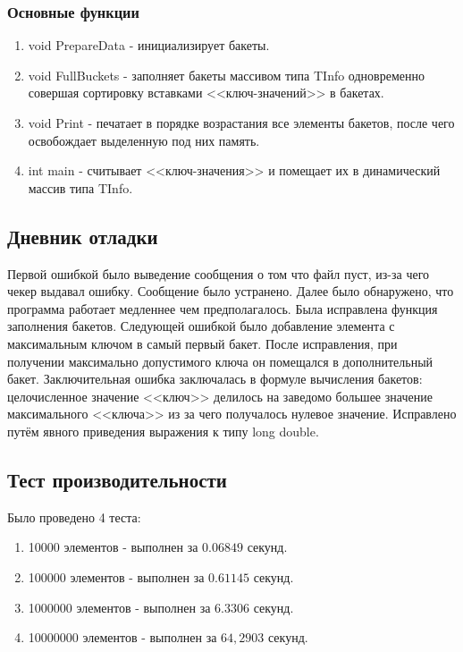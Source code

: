\documentclass[12pt]{article}
\begin{document}
\subsubsection*{Основные функции}

\begin{enumerate}
\item void PrepareData - инициализирует бакеты.
\item void FullBuckets - заполняет бакеты массивом типа TInfo одновременно совершая сортировку вставками <<ключ-значений>> в бакетах.
\item void Print - печатает в порядке возрастания все элементы бакетов, после чего освобождает выделенную под них память.
\item int main - считывает <<ключ-значения>> и помещает их в динамический массив типа TInfo.
\end{enumerate}

\subsection*{Дневник отладки}

Первой ошибкой было выведение сообщения о том что файл пуст, из-за чего чекер выдавал ошибку. 
Сообщение было устранено. 
Далее было обнаружено, что программа работает медленнее чем предполагалось. 
Была исправлена функция заполнения бакетов. 
Следующей ошибкой было добавление элемента с максимальным ключом в самый первый бакет.
После исправления, при получении максимально допустимого ключа он помещался в дополнительный бакет. 
Заключительная ошибка заключалась в формуле вычисления бакетов: целочисленное значение <<ключ>> делилось на заведомо большее значение максимального <<ключа>> из за чего получалось нулевое значение. 
Исправлено путём явного приведения выражения к типу long double.

\subsection*{Тест производительности}

Было проведено 4 теста:
\begin{enumerate}
\item 10000 элементов - выполнен за $0.06849$ секунд.
\item 100000 элементов - выполнен за $0.61145$ секунд.
\item 1000000 элементов - выполнен за $6.3306$ секунд.
\item 10000000 элементов - выполнен за $64,2903$ секунд.
\end{enumerate}
\end{document}
